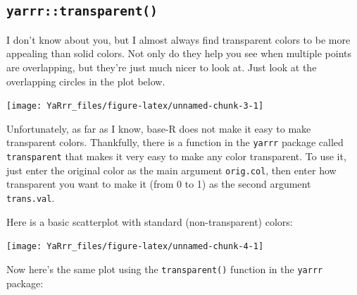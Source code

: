 \documentclass[]{book}
\newenvironment{Shaded}{\begin{snugshade}}{\end{snugshade}}
\newcommand{\KeywordTok}[1]{\textcolor[rgb]{0.13,0.29,0.53}{\textbf{{#1}}}}
\newcommand{\DataTypeTok}[1]{\textcolor[rgb]{0.13,0.29,0.53}{{#1}}}
\newcommand{\DecValTok}[1]{\textcolor[rgb]{0.00,0.00,0.81}{{#1}}}
\newcommand{\StringTok}[1]{\textcolor[rgb]{0.31,0.60,0.02}{{#1}}}
\newcommand{\CommentTok}[1]{\textcolor[rgb]{0.56,0.35,0.01}{\textit{{#1}}}}
\newcommand{\NormalTok}[1]{{#1}}
\theoremstyle{definition}
\theoremstyle{definition}
\theoremstyle{remark}
\begin{document}
\subsection{\texorpdfstring{\texttt{yarrr::transparent()}}{yarrr::transparent()}}\label{yarrrtransparent}

I don't know about you, but I almost always find transparent colors to
be more appealing than solid colors. Not only do they help you see when
multiple points are overlapping, but they're just much nicer to look at.
Just look at the overlapping circles in the plot below.

\begin{center}\texttt{[image: YaRrr\_files/figure-latex/unnamed-chunk-3-1]} \end{center}

Unfortunately, as far as I know, base-R does not make it easy to make
transparent colors. Thankfully, there is a function in the
\texttt{yarrr} package called \texttt{transparent} that makes it very
easy to make any color transparent. To use it, just enter the original
color as the main argument \texttt{orig.col}, then enter how transparent
you want to make it (from 0 to 1) as the second argument
\texttt{trans.val}.

Here is a basic scatterplot with standard (non-transparent) colors:

\begin{Shaded}
\end{Shaded}

\begin{center}\texttt{[image: YaRrr\_files/figure-latex/unnamed-chunk-4-1]} \end{center}

Now here's the same plot using the \texttt{transparent()} function in
the \texttt{yarrr} package:

\begin{Shaded}
\end{Shaded}
\end{document}
